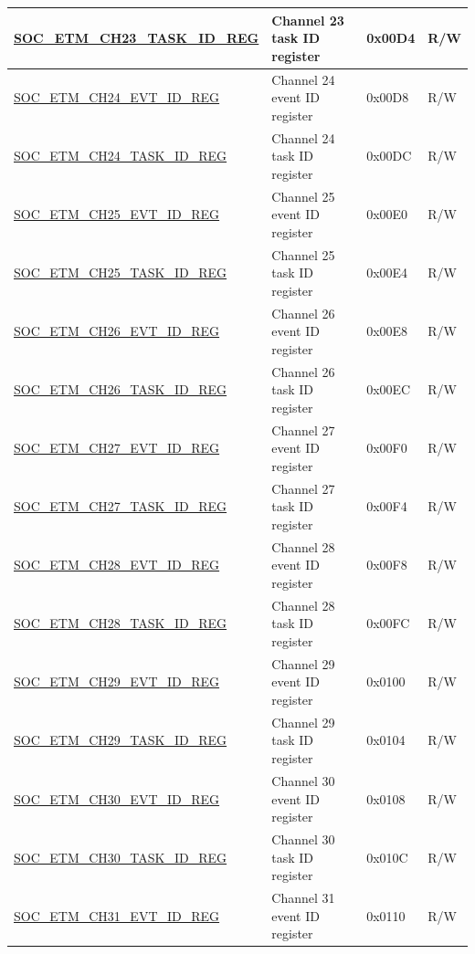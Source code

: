 \begin{longtable}{ | p{6cm} | p{6.2cm} | p{1.3cm} | p{2cm} | }
\hyperref[regdesc:SOCETMCHNTASKIDREG]{SOC\_ETM\_CH23\_TASK\_ID\_REG} & Channel 23 task ID register & 0x00D4 & R/W \\ \hline
\hyperref[regdesc:SOCETMCHNEVTIDREG]{SOC\_ETM\_CH24\_EVT\_ID\_REG} & Channel 24 event ID register & 0x00D8 & R/W \\ \hline
\hyperref[regdesc:SOCETMCHNTASKIDREG]{SOC\_ETM\_CH24\_TASK\_ID\_REG} & Channel 24 task ID register & 0x00DC & R/W \\ \hline
\hyperref[regdesc:SOCETMCHNEVTIDREG]{SOC\_ETM\_CH25\_EVT\_ID\_REG} & Channel 25 event ID register & 0x00E0 & R/W \\ \hline
\hyperref[regdesc:SOCETMCHNTASKIDREG]{SOC\_ETM\_CH25\_TASK\_ID\_REG} & Channel 25 task ID register & 0x00E4 & R/W \\ \hline
\hyperref[regdesc:SOCETMCHNEVTIDREG]{SOC\_ETM\_CH26\_EVT\_ID\_REG} & Channel 26 event ID register & 0x00E8 & R/W \\ \hline
\hyperref[regdesc:SOCETMCHNTASKIDREG]{SOC\_ETM\_CH26\_TASK\_ID\_REG} & Channel 26 task ID register & 0x00EC & R/W \\ \hline
\hyperref[regdesc:SOCETMCHNEVTIDREG]{SOC\_ETM\_CH27\_EVT\_ID\_REG} & Channel 27 event ID register & 0x00F0 & R/W \\ \hline
\hyperref[regdesc:SOCETMCHNTASKIDREG]{SOC\_ETM\_CH27\_TASK\_ID\_REG} & Channel 27 task ID register & 0x00F4 & R/W \\ \hline
\hyperref[regdesc:SOCETMCHNEVTIDREG]{SOC\_ETM\_CH28\_EVT\_ID\_REG} & Channel 28 event ID register & 0x00F8 & R/W \\ \hline
\hyperref[regdesc:SOCETMCHNTASKIDREG]{SOC\_ETM\_CH28\_TASK\_ID\_REG} & Channel 28 task ID register & 0x00FC & R/W \\ \hline
\hyperref[regdesc:SOCETMCHNEVTIDREG]{SOC\_ETM\_CH29\_EVT\_ID\_REG} & Channel 29 event ID register & 0x0100 & R/W \\ \hline
\hyperref[regdesc:SOCETMCHNTASKIDREG]{SOC\_ETM\_CH29\_TASK\_ID\_REG} & Channel 29 task ID register & 0x0104 & R/W \\ \hline
\hyperref[regdesc:SOCETMCHNEVTIDREG]{SOC\_ETM\_CH30\_EVT\_ID\_REG} & Channel 30 event ID register & 0x0108 & R/W \\ \hline
\hyperref[regdesc:SOCETMCHNTASKIDREG]{SOC\_ETM\_CH30\_TASK\_ID\_REG} & Channel 30 task ID register & 0x010C & R/W \\ \hline
\hyperref[regdesc:SOCETMCHNEVTIDREG]{SOC\_ETM\_CH31\_EVT\_ID\_REG} & Channel 31 event ID register & 0x0110 & R/W \\ \hline

\end{longtable}
